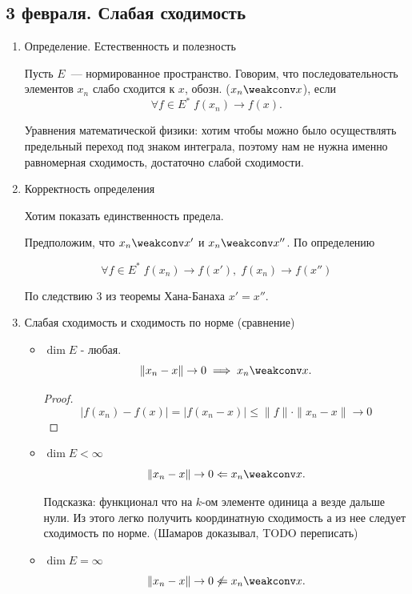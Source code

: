 \subsection{3 февраля. Слабая сходимость}

\begin{enumerate}
    \item Определение. Естественность и полезность

    \begin{definition}
    Пусть $E$~--- нормированное пространство. Говорим, что последовательность элементов $x_n$ слабо сходится к $x$, обозн. ($x_n \weakconv x$), если \[\forall f \in E^*\; f(x_n) \to f(x).\]
    \end{definition}

    Уравнения математической физики: хотим чтобы можно было осуществлять предельный переход под знаком интеграла, поэтому нам не нужна именно равномерная сходимость, достаточно слабой сходимости.

    \item Корректность определения

    Хотим показать единственность предела.

    Предположим, что $x_n \weakconv x'$ и $x_n \weakconv x''$. По определению 

    \[ \forall f \in E^* \; f(x_n) \to f(x'), \; f(x_n) \to f(x'')\]

    По следствию 3 из теоремы Хана-Банаха \(x' = x''\).

    \item Слабая сходимость и сходимость по норме (сравнение)
    \begin{itemize}
        \item $\dim E$ - любая.\\
        \[\|x_n - x\| \to 0 \implies x_n \weakconv x.\]

        \begin{proof}
            \[|f(x_n)-f(x)|=|f(x_n-x)| \leqslant \|f\| \cdot \|x_n - x\| \to 0 \]
        \end{proof}
        
        \item $\dim E < \infty$
        \[\|x_n - x\| \to 0 \Leftarrow x_n \weakconv x.\]
        \begin{exercise}
            Подсказка: функционал что на $k$-ом элементе одиница а везде дальше нули. Из этого легко получить координатную сходимость а из нее следует сходимость по норме. (Шамаров доказывал, TODO переписать)
        \end{exercise}
        \item $\dim E = \infty$
        \[\|x_n - x\| \to 0 \not\Leftarrow x_n \weakconv x.\]


\end{itemize}
\end{enumerate}
